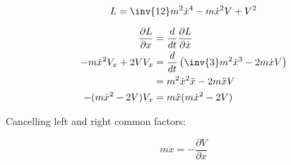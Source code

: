 \documentclass{article}      %
\newcommand{\xdot}[0]{\dot{x}}
\newcommand{\xddot}[0]{\ddot{x}}
\begin{document}


\begin{equation*}
L = \inv{12}m^2 \xdot^4 - m \xdot^2 V + V^2
\end{equation*}

\begin{align*}
\frac{\partial L}{\partial x} &= \frac{d}{dt} \frac{\partial L}{\partial \xdot} \\
-m \xdot^2 V_x + 2V V_x &= \frac{d}{dt} \left( \inv{3}m^2 \xdot^3 - 2 m \xdot V \right) \\
                        &= m^2 \xdot^2 \xddot - 2m \xddot V \\
-(m \xdot^2 -2V) V_x    &= m \xddot (m \xdot^2 - 2 V) \\
\end{align*}

Cancelling left and right common factors:

\begin{equation*}
m \xddot = -\frac{\partial V}{\partial x}
\end{equation*}
\end{document}
